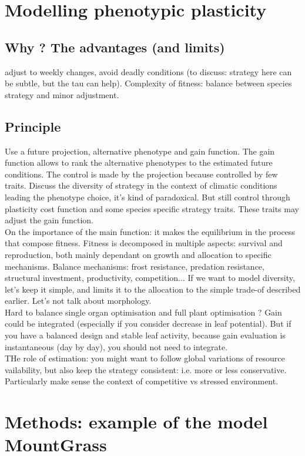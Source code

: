 \documentclass[review]{elsarticle}
\begin{document}
\section{Modelling phenotypic plasticity}
\subsection{Why ? The advantages (and limits)}
adjust to weekly changes, avoid deadly conditions (to discuss: strategy here can be subtle, but the tau can help). Complexity of fitness: balance between species strategy and minor adjustment. 

\subsection{Principle}
Use a future projection, alternative phenotype and gain function. The gain function allows to rank the alternative phenotypes to the estimated future conditions. The control is made by the projection because controlled by few traits. Discuss the diversity of strategy in the context of climatic conditions leading the phenotype choice, it's kind of paradoxical. But still control through plasticity cost function and some species specific strategy traits. These traits may adjust the gain function. \\
On the importance of the main function: it makes the equilibrium in the process that compose fitness. Fitness is decomposed in multiple aspects: survival and reproduction, both mainly dependant on growth and allocation to specific mechanisms. Balance mechanisms: frost resistance, predation resistance, structural investment, productivity, competition... If we want to model diversity, let's keep it simple, and limits it to the allocation to the simple trade-of described earlier. Let's not talk about morphology.\\
Hard to balance single organ optimisation and full plant optimisation ? Gain could be integrated (especially if you consider decrease in leaf potential). But if you have a balanced design and stable leaf activity, because gain evaluation is instantaneous (day by day), you should not need to integrate.\\
THe role of estimation: you might want to follow global variations of resource vailability, but also keep the strategy consistent: i.e. more or less conservative. Particularly make sense the context of competitive vs stressed environment.

\section{Methods: example of the model MountGrass}
\end{document}
